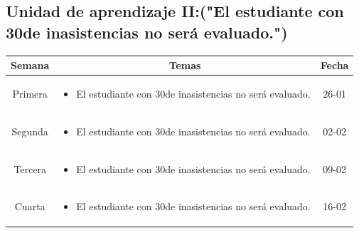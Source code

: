 \documentclass[a4paper]{article}
\begin{document}
\subsection{Unidad de aprendizaje II:("El estudiante con 30de inasistencias no será evaluado.")}
\begin{table}[ht]
\centering
\begin{tabular}{|c|c|c|}
\hline
\textbf{Semana} & \textbf{Temas} & \textbf{Fecha} \\ 
\hline
Primera 
& \begin{minipage}[t]{10cm}
\begin{itemize}
\item El estudiante con 30de inasistencias no será evaluado.
\end{itemize}
\end{minipage} & 26-01\\ 
\hline 
Segunda 
& \begin{minipage}[t]{10cm}
\begin{itemize}
\item El estudiante con 30de inasistencias no será evaluado.
\end{itemize}
\end{minipage} & 02-02\\ 
\hline 
Tercera 
& \begin{minipage}[t]{10cm}
\begin{itemize}
\item El estudiante con 30de inasistencias no será evaluado.
\end{itemize}
\end{minipage} & 09-02 \\ 
\hline 
Cuarta 
& \begin{minipage}[t]{10cm}
\begin{itemize}
\item El estudiante con 30de inasistencias no será evaluado.
\end{itemize}
\end{minipage} & 16-02 \\ 
\hline 
\end{tabular}
\end{table}
\newpage
\end{document}
